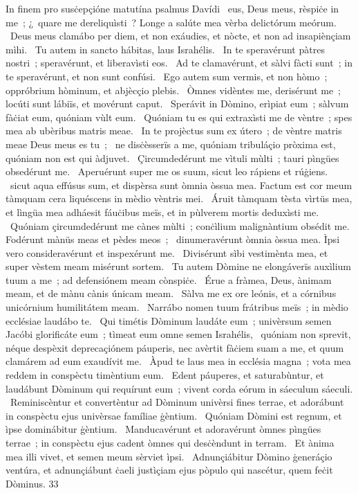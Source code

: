 { In finem pro susċepçióne matutína psalmus Davídi}
{%
~eus, Deus meus, rèspiċe in me~; ¿~quare me dereliquìsti~? Longe a salúte mea vèrba delictórum meórum. 
~Deus meus clamábo per diem, et non exáudies, et nòcte, et non ad insapiènçiam mìhi. 
~Tu autem in sancto hábitas, laus Israhélis. 
~In te speravérunt pàtres nostri~; speravérunt, et liberavìsti eos. 
~Ad te clamavérunt, et sàlvi fàcti sunt~; in te speravérunt, et non sunt confúsi. 
~Ego autem sum vermis, et non hòmo~; oppróbrium hòminum, et abjècçio plebis. 
~Òmnes vidèntes me, derisérunt me~; locúti sunt lábiïs, et movérunt caput. 
~Sperávit in Dòmino, erìpiat eum~; sàlvum fàċiat eum, quóniam vùlt eum. 
~Quóniam tu es qui extraxìsti me de vèntre~; spes mea ab ubèribus matris meae. 
~In te projèctus sum ex útero~; de vèntre matris meae Deus meus es tu~; 
~ne disċèsserïs a me, quóniam tribuláçio pròxima est, quóniam non est qui àdjuvet. 
~Çircumdedérunt me vìtuli mùlti~; tauri pìngües obsedérunt me. 
~Aperuérunt super me os suum, sicut leo rápiens et rúġiens. 
~sicut aqua effúsus sum, et dispèrsa sunt òmnia òssua mea. Factum est cor meum tàmquam cera liquéscens in mèdio vèntris mei. 
~Áruit tàmquam tèsta vìrtüs mea, et lìngüa mea adháesit fáuċibus meïs, et in pùlverem mortis deduxìsti me. 
~Quóniam çircumdedérunt me cànes mùlti~; conċìlium malignàntium obsédit me. Fodérunt mànüs meas et pèdes meos~; 
~dinumeravérunt òmnia òssua mea. Ìpsi vero consideravérunt et inspexérunt me. 
~Divisérunt sìbi vestimènta mea, et super vèstem meam misérunt sortem. 
~Tu autem Dòmine ne elongáverïs auxìlium tuum a me~; ad defensiónem meam cònspiċe. 
~Érue a fràmea, Deus, ànimam meam, et de mànu cànis únicam meam. 
~Sàlva me ex ore leónis, et a córnibus unicórnium humilitátem meam. 
~Narrábo nomen tuum frátribus meïs~; in mèdio ecclésiae laudábo te. 
~Qui timétis Dòminum laudáte eum~; univèrsum semen Jacóbi glorificáte eum~; tìmeat eum omne semen Israhélis, 
~quóniam non sprevit, néque despèxit deprecaçiónem páuperis, nec avèrtit fàċiem suam a me, et quum clamárem ad eum exaudívit me. 
~Àpud te laus mea in ecclésia magna~; vota mea reddem in conspèctu timèntium eum. 
~Edent páuperes, et saturabùntur, et laudábunt Dòminum qui requírunt eum~; vivent corda eórum in sáeculum sáeculi. 
~Reminiscèntur et convertèntur ad Dòminum univèrsi fines terrae, et adorábunt in conspèctu ejus univèrsae famíliae ġèntium. 
~Quóniam Dòmini est regnum, et ìpse dominábitur ġèntium. 
~Manducavérunt et adoravérunt òmnes pìngües terrae~; in conspèctu ejus cadent òmnes qui desċèndunt in terram. 
~Et ànima mea illi vivet, et semen meum sèrviet ìpsi. 
~Adnunçiábitur Dòmino ġeneráçio ventúra, et adnunçiábunt ċaeli justìçiam ejus pòpulo qui nascétur, quem feċit Dòminus. 
}
{3}{3}
